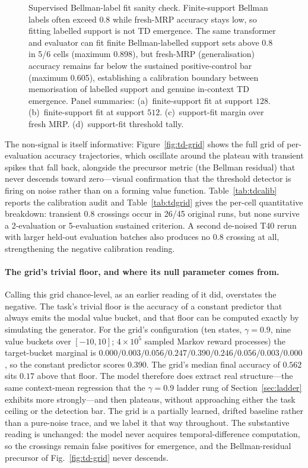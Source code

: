 \documentclass[11pt]{article}
\theoremstyle{plain}
\theoremstyle{definition}
\begin{document}
\begin{figure}[htbp]
\centering
{}
\caption{Supervised Bellman-label fit sanity check. Finite-support Bellman labels often
exceed 0.8 while fresh-MRP accuracy stays low, so fitting labelled support is not TD emergence.
The same transformer and evaluator can fit finite Bellman-labelled support sets above 0.8
in 5/6 cells (maximum 0.898), but fresh-MRP (generalisation) accuracy remains far below
the sustained positive-control bar (maximum 0.605), establishing a calibration boundary
between memorisation of labelled support and genuine in-context TD emergence.
Panel summaries: (a)~finite-support fit at support $128$. (b)~finite-support fit at support $512$. (c)~support-fit margin over fresh MRP. (d)~support-fit threshold tally.}
\label{fig:supervised-fit}
\end{figure}

The non-signal is itself
informative: Figure~\ref{fig:td-grid} shows the full grid of per-evaluation accuracy
trajectories, which oscillate around the plateau with transient spikes that fall back, alongside
the precursor metric (the Bellman residual) that never descends toward zero---visual
confirmation that the threshold detector is firing on noise rather than on a forming value
function.
Table~\ref{tab:tdcalib} reports the
calibration audit and Table~\ref{tab:tdgrid} gives the per-cell quantitative breakdown:
transient $0.8$ crossings occur in 26/45 original runs, but none survive
a 2-evaluation or 5-evaluation sustained criterion. A second de-noised T40 rerun with
larger held-out evaluation batches also produces no $0.8$ crossing at all, strengthening the
negative calibration reading.

\paragraph{The grid's trivial floor, and where its null parameter comes from.}
Calling this grid chance-level, as an earlier reading of it did, overstates the negative.
The task's trivial floor is the accuracy of a constant predictor that always emits the
modal value bucket, and that floor can be computed exactly by simulating the generator.
For the grid's configuration (ten states, $\gamma=0.9$, nine value buckets over
$[-10,10]$; $4\times10^{5}$ sampled Markov reward processes) the target-bucket marginal is
$0.000/0.003/0.056/0.247/0.390/0.246/0.056/0.003/0.000$, so the constant predictor scores
$0.390$. The grid's median final accuracy of $0.562$ sits $0.17$ above that floor. The
model therefore does extract real structure---the same context-mean regression that the
$\gamma=0.9$ ladder rung of Section~\ref{sec:ladder} exhibits more strongly---and then
plateaus, without approaching either the task ceiling or the detection bar. The grid is a
partially learned, drifted baseline rather than a pure-noise trace, and we label it that
way throughout. The substantive reading is unchanged: the model never acquires
temporal-difference computation, so the crossings remain false positives for emergence,
and the Bellman-residual precursor of Fig.~\ref{fig:td-grid} never descends.
\end{document}
